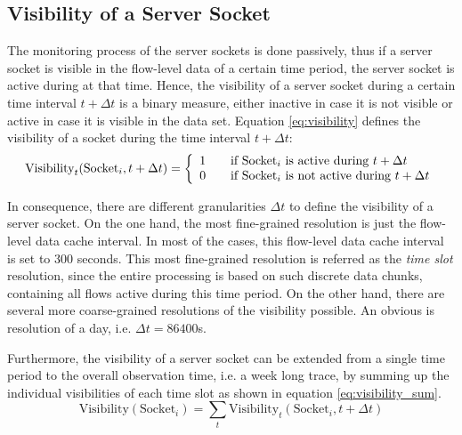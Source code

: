 \subsection{Visibility of a Server Socket\label{subsection:visibility}}

The monitoring process of the \glspl{server socket} is done passively, thus if a 
\gls{server socket} is visible in the flow-level data of a certain time period, 
the \gls{server socket} is active during at that time. Hence, the visibility of 
a \gls{server socket} during a certain time interval $t+\Delta{t}$ is a binary 
measure, either inactive in case it is not visible or active in case it is 
visible in the data set. Equation \ref{eq:visibility} defines the visibility of 
a socket during the time interval $t+\Delta{t}$: 
\begin{equation}
	\text{Visibility}_t(\text{Socket}_i,t+\Delta{t}) = \left\{ 
	\begin{array}{l l}
		1 & \quad \text{if $\text{Socket}_i$ is active during $t+\Delta{t}$}\\
		0 & \quad \text{if $\text{Socket}_i$ is not active during $t+\Delta{t}$}\\
	\end{array}
	\right. 
	\label{eq:visibility} 
\end{equation}

In consequence, there are different granularities $\Delta{t}$ to define the 
visibility of a \gls{server socket}. On the one hand, the most fine-grained 
resolution is just the flow-level data cache interval. In most of the cases, 
this flow-level data cache interval is set to 300 seconds. This most 
fine-grained resolution is referred as the \emph{time slot} resolution, since 
the entire processing is based on such discrete data chunks, containing all 
flows active during this time period. 
On the other hand, there are several more coarse-grained resolutions of the 
visibility possible. An obvious is resolution of a day, i.e. 
$\Delta{t} = 86400$s.

Furthermore, the visibility of a \gls{server socket} can be extended from a 
single time period to the overall observation time, i.e. a week long trace, by 
summing up the individual visibilities of each time slot as shown in equation 
\ref{eq:visibility_sum}.
\begin{equation}
	\text{Visibility}(\text{Socket}_i) = \sum_{t} \text{Visibility}_t(\text{Socket}_i,t+\Delta{t})
	\label{eq:visibility_sum} 
\end{equation}


